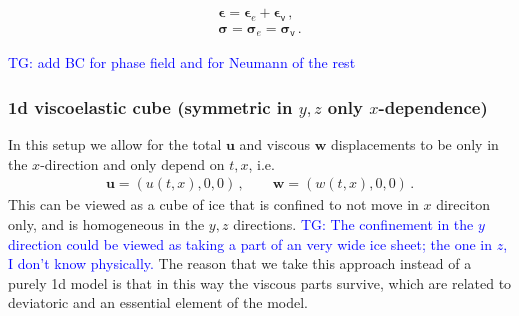 \documentclass[11pt,a4paper]{article}
\newcommand{\tg}[1]{\textcolor{blue}{TG: #1} }
\newcommand{\bb}[1]{\boldsymbol{#1}}
\newcommand{\varv}{\mathsf{v}}
\begin{document}
\begin{align*}
    \bb{\epsilon} = \bb{\epsilon}_e + \bb{\epsilon}_\varv
    \,,
    \\
    \bb{\sigma} = \bb{\sigma}_e = \bb{\sigma}_\varv
    \,.
\end{align*}

\tg{add BC for phase field and for Neumann of the rest}

\subsubsection{1d viscoelastic cube \texorpdfstring{(symmetric in $y,z$ only $x$-dependence)}{}}

In this setup we allow for the total $\bb{u}$ and viscous $\bb{w}$ displacements to be only in the $x$-direction and only depend on $t,x$, i.e.
\begin{align*}
    \bb{u} = (u(t,x),0,0)\,, \qquad
    \bb{w} = (w(t,x),0,0)
    \,.
\end{align*}
This can be viewed as a cube of ice that is confined to not move in $x$ direciton only, and is homogeneous in the $y,z$ directions. 
%
\tg{The confinement in the $y$ direction could be viewed as taking a part of an very wide ice sheet; the one in $z$, I don't know physically.}
%
The reason that we take this approach instead of a purely 1d model is that in this way the viscous parts survive, which are related to deviatoric and an essential element of the model. 
\end{document}
